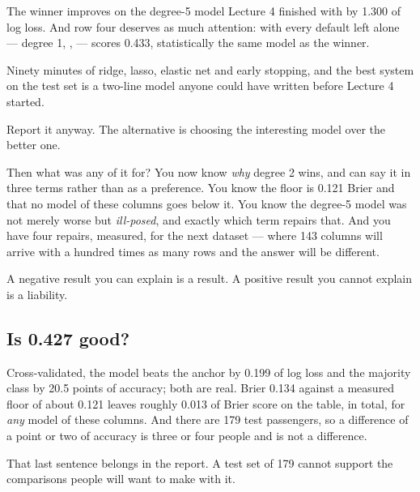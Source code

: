 \documentclass[11pt,a4paper]{article}
\begin{document}
The winner improves on the degree-5 model Lecture 4 finished with by 1.300 of
log loss. And row four deserves as much attention: 
with every default left alone --- degree 1, , 
--- scores 0.433, statistically the same model as the winner.

\begin{failbox}[title={The result nobody wanted}]
Ninety minutes of ridge, lasso, elastic net and early stopping, and the best
system on the test set is a two-line model anyone could have written before
Lecture 4 started.

Report it anyway. The alternative is choosing the interesting model over the
better one.
\end{failbox}

Then what was any of it for? You now know \emph{why} degree 2 wins, and can say
it in three terms rather than as a preference. You know the floor is 0.121
Brier and that no model of these columns goes below it. You know the degree-5
model was not merely worse but \emph{ill-posed}, and exactly which term repairs
that. And you have four repairs, measured, for the next dataset --- where 143
columns will arrive with a hundred times as many rows and the answer will be
different.

A negative result you can explain is a result. A positive result you cannot
explain is a liability.

\subsection{Is 0.427 good?}

Cross-validated, the model beats the anchor by 0.199 of log loss and the
majority class by 20.5 points of accuracy; both are real. Brier 0.134 against a
measured floor of about 0.121 leaves roughly 0.013 of Brier score on the table,
in total, for \emph{any} model of these columns. And there are 179 test
passengers, so a difference of a point or two of accuracy is three or four
people and is not a difference.

That last sentence belongs in the report. A test set of 179 cannot support the
comparisons people will want to make with it.
\end{document}
